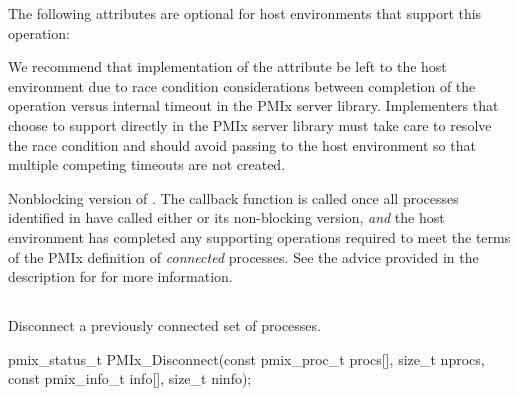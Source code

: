 \reqattrend

\optattrstart
The following attributes are optional for host environments that support this operation:


\optattrend

\adviceimplstart
We recommend that implementation of the  attribute be left to the host environment due to race condition considerations between completion of the operation versus internal timeout in the \ac{PMIx} server library. Implementers that choose to support  directly in the \ac{PMIx} server library must take care to resolve the race condition and should avoid passing  to the host environment so that multiple competing timeouts are not created.
\adviceimplend

\descr

Nonblocking version of . The callback function is called once all processes identified in  have called either  or its non-blocking version, \textit{and} the host environment has completed any supporting operations required to meet the terms of the \ac{PMIx} definition of \textit{connected} processes. See the advice provided in the description for  for more information.


\subsection{}

\summary

Disconnect a previously connected set of processes.

\format

\cspecificstart
\begin{codepar}
pmix_status_t
PMIx_Disconnect(const pmix_proc_t procs[], size_t nprocs,
                const pmix_info_t info[], size_t ninfo);
\end{codepar}
\cspecificend

\begin{arglist}
\end{arglist}

